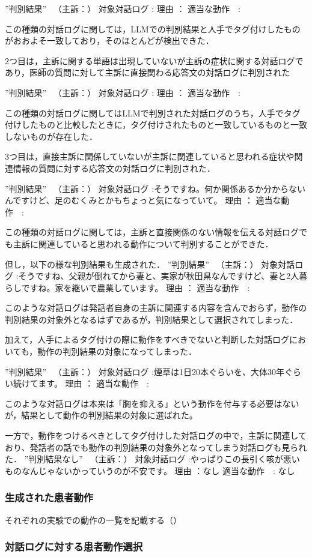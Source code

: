 ”判別結果” 　（主訴：）
  対象対話ログ  :
         理由  ：
    適当な動作　:

この種類の対話ログに関しては，LLMでの判別結果と人手でタグ付けしたものがおおよそ一致しており，そのほとんどが検出できた．

2つ目は，主訴に関する単語は出現していないが主訴の症状に関する対話ログであり，医師の質問に対して主訴に直接関わる応答文の対話ログに判別された

”判別結果” 　（主訴：）
  対象対話ログ  :
         理由  ：
    適当な動作　:

この種類の対話ログに関してはLLMで判別された対話ログのうち，人手でタグ付けしたものと比較したときに，タグ付けされたものと一致しているものと一致しないものが存在した．

3つ目は，直接主訴に関係していないが主訴に関連していると思われる症状や関連情報の質問に対する応答文の対話ログに判別された．

”判別結果” 　（主訴：）
  対象対話ログ  :そうですね。何か関係あるか分からないんですけど、足のむくみとかもちょっと気になっていて。
         理由  ：
    適当な動作　:

この種類の対話ログに関しては，主訴と直接関係のない情報を伝える対話ログでも主訴に関連していると思われる動作について判別することができた．

但し，以下の様な判別結果も生成された．
”判別結果” 　（主訴：）
  対象対話ログ  :そうですね、父親が倒れてから妻と、実家が秋田県なんですけど、妻と2人暮らしですね。家を継いで農業しています。
         理由  ：
    適当な動作　:

このような対話ログは発話者自身の主訴に関連する内容を含んでおらず，動作の判別結果の対象外となるはずであるが，判別結果として選択されてしまった．

加えて，人手によるタグ付けの際に動作をすべきでないと判断した対話ログにおいても，動作の判別結果の対象になってしまった．

”判別結果” 　（主訴：）
  対象対話ログ  :煙草は1日20本ぐらいを、大体30年ぐらい続けてます。
         理由  ：
    適当な動作　:

このような対話ログは本来は「胸を抑える」という動作を付与する必要はないが，結果として動作の判別結果の対象に選ばれた。
    
一方で，動作をつけるべきとしてタグ付けした対話ログの中で，主訴に関連しており、発話者の話でも動作の判別結果の対象外となってしまう対話ログも見られた．
”判別結果なし” 　（主訴：）
  対象対話ログ  :やっぱりこの長引く咳が悪いものなんじゃないかっていうのが不安です。
         理由  ：なし
    適当な動作　: なし

\subsubsection*{生成された患者動作}
それぞれの実験での動作の一覧を記載する（）


\subsubsection*{対話ログに対する患者動作選択}

